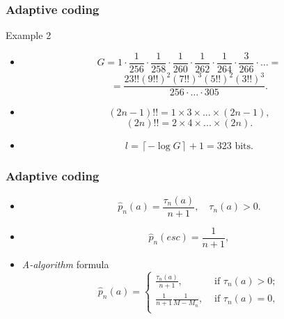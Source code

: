 \documentclass[14pt]{beamer}
\begin{document}
\begin{frame}
\frametitle{Adaptive coding}
Example 2
\begin{itemize}    
    
    \item
    \[
    G = 1 \cdot \frac{1}{256}\cdot \frac{1}{258}\cdot  \frac{1}{260}
     \cdot\frac{1}{262}\cdot\frac{1}{264}\cdot\frac{3}{266} \cdot\ldots=
    \]
    \[ =\frac{23!!(9!!)^2(7!!)^3(5!!)^2(3!!)^3}{256\cdot\ldots\cdot305}.
    \]

    \item
    \[(2n - 1)!! = 1\times 3\times ...\times (2n - 1),\]\[ (2n)!! = 2\times 4\times ...\times (2n).\]

    \item 
    \begin{equation}
    \label{examp_alg_2} l = \left\lceil { - \log G} \right\rceil + 1 =
    323\mbox{ bits} .
    \end{equation}

\end{itemize}
\end{frame}



\begin{frame}
\frametitle{Adaptive coding}
\begin{itemize}    
    
    \item
    \[
    \hat {p}_n (a) = \frac{\tau _n (a)}{n + 1}, \quad \tau _n (a) > 0.
    \]

    \item
    \[
    \hat {p}_n (esc) = \frac{1}{n + 1},
    \]

    \item \emph{A-algorithm} formula
    \begin{equation}
    \label{eq3_38} \hat {p}_n (a) = \left\{
    \begin{array}{ll}
     \frac{\tau _n (a)}{n + 1},&  \mbox{ if }\tau _n (a) > 0;  \\
     \frac{1}{n + 1} \frac{1}{M - M_n }, & \mbox{ if }\tau _n (a) = 0, \\
    \end{array}  \right.
    \end{equation}    
    
\end{itemize}
\end{frame}
\end{document}
